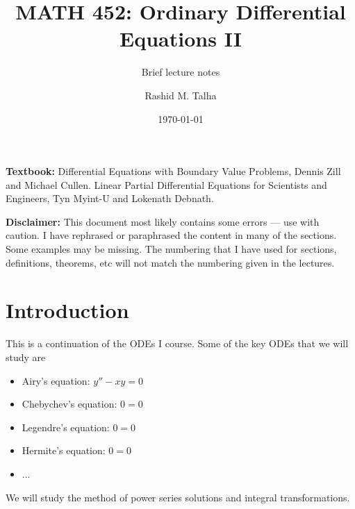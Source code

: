 \documentclass[11pt]{penrose}
\title{MATH 452: Ordinary Differential Equations II}
\subtitle{Brief lecture notes}
\author{Rashid M. Talha}
\affiliation{School of Natural Sciences, NUST}
\date{\today}
\begin{document}
\maketitle

\textbf{Textbook:} Differential Equations with Boundary Value Problems, Dennis Zill and Michael Cullen. Linear Partial Differential Equations for Scientists and Engineers, Tyn Myint-U and Lokenath Debnath.

\textbf{Disclaimer:} This document most likely contains some errors --- use with caution. I have rephrased or paraphrased the content in many of the sections. Some examples may be missing. The numbering that I have used for sections, definitions, theorems, etc will not match the numbering given in the lectures.

\section{Introduction}

This is a continuation of the ODEs I course. Some of the key ODEs that we will study are
\begin{itemize}
    \item Airy's equation: $\displaystyle y'' - xy = 0$
    \item Chebychev's equation: $\displaystyle 0 = 0$
    \item Legendre's equation: $\displaystyle 0 = 0$
    \item Hermite's equation: $\displaystyle 0 = 0$
    \item ...
\end{itemize}
We will study the method of power series solutions and integral transformations.


\end{document}
